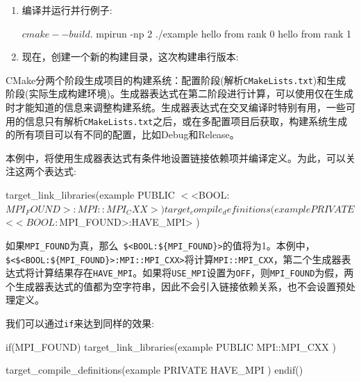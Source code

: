 \begin{enumerate}
\item 编译并运行并行例子:

\begin{codebox}[cmake]
$ cmake --build .
$ mpirun -np 2 ./example
hello from rank 0
hello from rank 1
\end{codebox}

\item 现在，创建一个新的构建目录，这次构建串行版本:


\end{enumerate}


CMake分两个阶段生成项目的构建系统：配置阶段(解析\texttt{CMakeLists.txt})和生成阶段(实际生成构建环境)。生成器表达式在第二阶段进行计算，可以使用仅在生成时才能知道的信息来调整构建系统。生成器表达式在交叉编译时特别有用，一些可用的信息只有解析\texttt{CMakeLists.txt}之后，或在多配置项目后获取，构建系统生成的所有项目可以有不同的配置，比如Debug和Release。

本例中，将使用生成器表达式有条件地设置链接依赖项并编译定义。为此，可以关注这两个表达式:

\begin{codebox}[cmake]
target_link_libraries(example
  PUBLIC
    $<$<BOOL:${MPI_FOUND}>:MPI::MPI_CXX>
  )
target_compile_definitions(example
  PRIVATE
    $<$<BOOL:${MPI_FOUND}>:HAVE_MPI>
  )
\end{codebox}

如果\texttt{MPI\_FOUND}为真，那么\texttt{ \$<BOOL:\$\{MPI\_FOUND\}>}的值将为1。本例中，\texttt{\$<\$<BOOL:\$\{MPI\_FOUND\}>:MPI::MPI\_CXX>}将计算\texttt{MPI::MPI\_CXX}，第二个生成器表达式将计算结果存在\texttt{HAVE\_MPI}。如果将\texttt{USE\_MPI}设置为\texttt{OFF}，则\texttt{MPI\_FOUND}为假，两个生成器表达式的值都为空字符串，因此不会引入链接依赖关系，也不会设置预处理定义。

我们可以通过\texttt{if}来达到同样的效果:

\begin{codebox}[cmake]
if(MPI_FOUND)
  target_link_libraries(example
    PUBLIC
        MPI::MPI_CXX
    )
    
  target_compile_definitions(example
    PRIVATE
        HAVE_MPI
    )
endif() 
\end{codebox}

